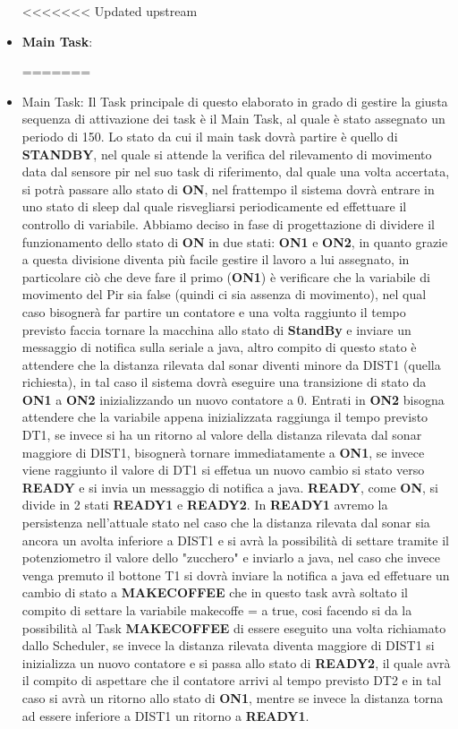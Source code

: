 \documentclass[a4paper]{article}
\begin{document}
\begin{itemize}
<<<<<<< Updated upstream
\item \textbf{Main Task}:



=======
\item {Main Task}:
Il Task principale di questo elaborato in grado di gestire la giusta sequenza di attivazione dei task è il Main Task, al quale è stato assegnato un periodo di 150.
Lo stato da cui il main task dovrà partire è quello di \textbf{STANDBY}, nel quale si attende la verifica del rilevamento di movimento data dal sensore pir nel suo task di riferimento, dal quale una volta accertata, si potrà passare allo stato di \textbf{ON}, nel frattempo il sistema dovrà entrare in uno stato di sleep dal quale risvegliarsi periodicamente ed effettuare il controllo di variabile.
Abbiamo deciso in fase di progettazione di dividere il funzionamento dello stato di \textbf{ON} in due stati: \textbf{ON1} e \textbf{ON2}, in quanto grazie a questa divisione diventa più facile gestire il lavoro a lui assegnato, in particolare ciò che deve fare il primo (\textbf{ON1}) è verificare che la variabile di movimento del Pir sia false (quindi ci sia assenza di movimento), nel qual caso bisognerà far partire un contatore e una volta raggiunto il tempo previsto faccia tornare la macchina allo stato di \textbf{StandBy} e inviare un messaggio di notifica sulla seriale a java, altro compito di questo stato è attendere che la distanza rilevata dal sonar diventi minore da DIST1 (quella richiesta), in tal caso il sistema dovrà eseguire una transizione di stato da \textbf{ON1} a \textbf{ON2} inizializzando un nuovo contatore a 0.
Entrati in \textbf{ON2} bisogna attendere che la variabile appena inizializzata raggiunga il tempo previsto DT1, se invece si ha un ritorno al valore della distanza rilevata dal sonar maggiore di DIST1, bisognerà tornare immediatamente a \textbf{ON1}, se invece viene raggiunto il valore di DT1 si effetua un nuovo cambio si stato verso \textbf{READY} e si invia un messaggio di notifica a java.
\textbf{READY}, come \textbf{ON}, si divide in 2 stati \textbf{READY1} e \textbf{READY2}. In \textbf{READY1} avremo la persistenza nell'attuale stato nel caso che la distanza rilevata dal sonar sia ancora un avolta inferiore a DIST1 e si avrà la possibilità di settare tramite il potenziometro il valore dello "zucchero" e inviarlo a java, nel caso che invece venga premuto il bottone T1 si dovrà inviare la notifica a java ed effetuare un cambio di stato a \textbf{MAKECOFFEE} che in questo task avrà soltato il compito di settare la variabile makecoffe = a true, cosi facendo si da la possibilità al Task \textbf{MAKECOFFEE} di essere eseguito una volta richiamato dallo Scheduler, se invece la distanza rilevata diventa maggiore di DIST1 si inizializza un nuovo contatore e si passa allo stato di \textbf{READY2}, il quale avrà il compito di aspettare che il contatore arrivi al tempo previsto DT2 e in tal caso si avrà un ritorno allo stato di \textbf{ON1}, mentre se invece la distanza torna ad essere inferiore a DIST1 un ritorno a \textbf{READY1}.

\end{itemize}
\end{document}
